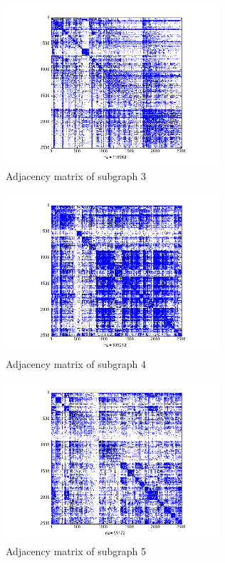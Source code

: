 \documentclass[11pt]{article}
\begin{document}
		\begin{figure}
				\begin{center}
		 		\includegraphics[width=300px]{../graphs/a3.png}
		 	\end{center}
		 	\caption{Adjacency matrix of subgraph 3}
		 	\label{fig:a3}
		\end{figure}

		\begin{figure}
				\begin{center}
		 		\includegraphics[width=300px]{../graphs/a4.png}
		 	\end{center}
		 	\caption{Adjacency matrix of subgraph 4}
		 	\label{fig:a4}
		\end{figure}

		\begin{figure}
				\begin{center}
		 		\includegraphics[width=300px]{../graphs/a5.png}
		 	\end{center}
		 	\caption{Adjacency matrix of subgraph 5}
		 	\label{fig:a5}
		\end{figure}
\end{document}
